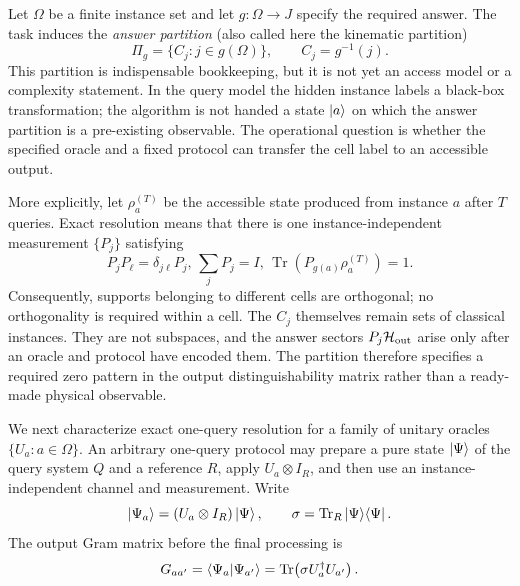 \documentclass[
  aps,
  prl,
  reprint,
  nofootinbib
]{revtex4-2}
\begin{document}
Let \(\Omega\) be a finite instance set and let
\(g:\Omega\rightarrow J\) specify the required answer. The task induces the
\emph{answer partition} (also called here the kinematic partition)
\begin{equation}
 \Pi_g=\{C_j:j\in g(\Omega)\},\qquad C_j=g^{-1}(j).
 \label{eq:task-partition}
\end{equation}
This partition is indispensable bookkeeping, but it is not yet an access model
or a complexity statement.
In the query model the hidden instance labels a black-box transformation; the
algorithm is not handed a state \(\ket a\) on which the answer partition is a
pre-existing observable. The operational question is whether the specified
oracle and a fixed protocol can transfer the cell label to an accessible
output.

More explicitly, let \(\rho_a^{(T)}\) be the accessible state produced from
instance \(a\) after \(T\) queries. Exact resolution means that there is one
instance-independent measurement \(\{P_j\}\) satisfying
\begin{equation}
 P_jP_\ell=\delta_{j\ell}P_j,\,
 \sum_jP_j=I,\,
 \operatorname{Tr}(P_{g(a)}\rho_a^{(T)})=1.
 \label{eq:output-sectors}
\end{equation}
Consequently, supports belonging to different cells are orthogonal; no
orthogonality is required within a cell. The \(C_j\) themselves remain sets of
classical instances. They are not subspaces, and the answer sectors
\(P_j\mathcal H_{\rm out}\) arise only after an oracle and protocol have
encoded them. The partition therefore specifies a required zero pattern in
the output distinguishability matrix rather than a ready-made physical
observable.

We next characterize exact one-query resolution for a family of unitary
oracles \(\{U_a:a\in\Omega\}\). An arbitrary
one-query protocol may prepare a pure state \(\ket\Psi\) of the query system
\(Q\) and a reference \(R\), apply \(U_a\otimes I_R\), and then use an
instance-independent channel and measurement. Write
\begin{equation}
 \ket{\Psi_a}=(U_a\otimes I_R)\ket\Psi,
 \qquad
 \sigma=\operatorname{Tr}_R\ket\Psi\!\bra\Psi .
\end{equation}
The output Gram matrix before the final processing is
\begin{equation}
 G_{aa'}=\braket{\Psi_a|\Psi_{a'}}
 =\operatorname{Tr}\!\left(\sigma U_a^\dagger U_{a'}\right).
 \label{eq:gram}
\end{equation}
\end{document}
